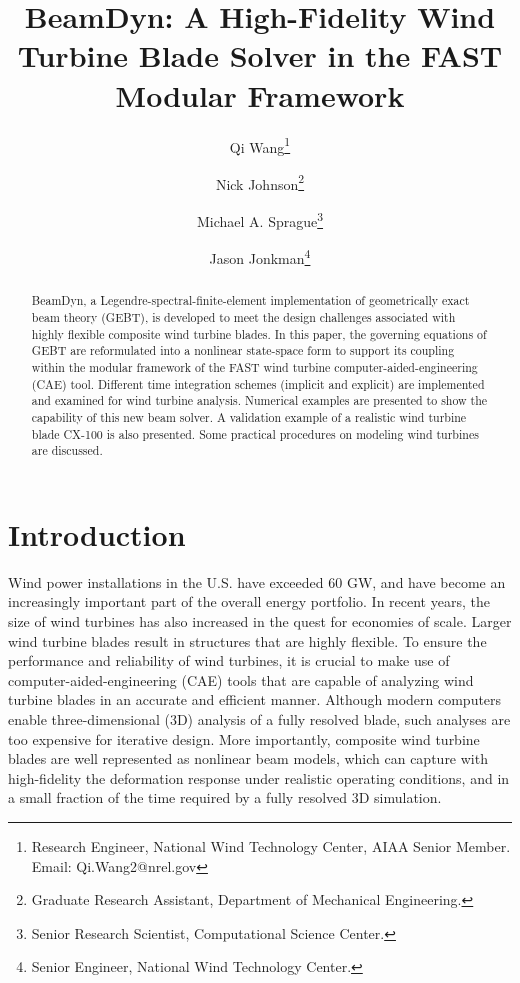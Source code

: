 \documentclass{aiaa-tc}
\title{BeamDyn: A High-Fidelity Wind Turbine Blade Solver in the FAST
Modular Framework}
\author[1]{Qi Wang\thanks{Research Engineer, National Wind Technology Center, AIAA Senior Member. Email: Qi.Wang2@nrel.gov}}
\author[2]{Nick Johnson\thanks{Graduate Research Assistant, Department of
Mechanical Engineering.}}
\author[1]{Michael A. Sprague\thanks{Senior Research Scientist, 
Computational Science Center.}}
\author[1]{Jason Jonkman\thanks{Senior Engineer, National Wind Technology Center.}}
\affil[1]{National Renewable Energy Laboratory, Golden, CO 80401}
\affil[2]{Colorado School of Mines, Golden, CO 80401}
\begin{document}
\maketitle

\begin{abstract}
{BeamDyn, a Legendre-spectral-finite-element implementation of geometrically
exact beam theory (GEBT), is developed to meet the design challenges
associated with highly flexible composite wind turbine blades. In this
paper, the governing equations of GEBT are reformulated into a nonlinear
state-space form to support its coupling within the
modular framework of the FAST wind turbine
computer-aided-engineering (CAE) tool. Different time integration
schemes (implicit and explicit) are implemented and examined for wind
turbine analysis.  Numerical examples are presented to show the capability of this new beam solver. A validation example of a realistic wind turbine blade CX-100 is also presented. Some practical procedures on modeling wind turbines are discussed.}     
\end{abstract}

\section{Introduction} Wind power installations in the U.S. have exceeded 60
GW, and have become an increasingly important part of the overall energy
portfolio. In recent years, the size of wind turbines has also increased in
the quest for economies of scale.  Larger wind turbine blades result in
structures that are highly flexible.  To ensure the performance and
reliability of wind turbines, it is crucial to make use of
computer-aided-engineering (CAE) tools that are capable of analyzing wind
turbine blades in an accurate and efficient manner. Although modern
computers enable three-dimensional (3D) analysis
of a fully resolved blade, such analyses are too
expensive for iterative design. More importantly, composite wind
turbine blades are well represented as nonlinear beam models, which can
capture with high-fidelity the deformation response under realistic
operating conditions, and in a small fraction of the time required by a
fully resolved 3D simulation. 
\end{document}
